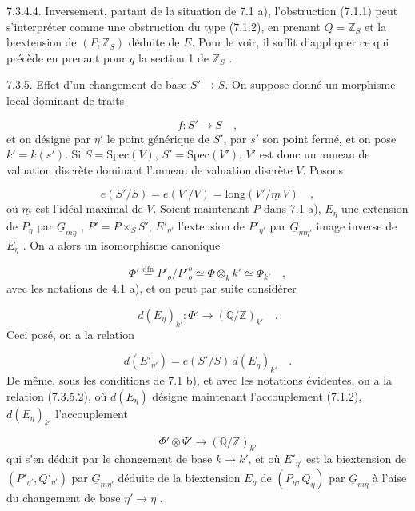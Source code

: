 7.3.4.4. Inversement, partant de la situation de 7.1 a), l'obstruction (7.1.1) peut s'interpréter comme une obstruction du type (7.1.2), en prenant $Q = \mathbb{Z}_S$ et la biextension de $(P,\mathbb{Z}_S)$ déduite de $E$. Pour le voir, il suffit d'appliquer ce qui précède en prenant pour $q$ la section 1 de $\mathbb{Z}_S$ .

7.3.5. \underline{Effet d'un changement de base} $S' \longrightarrow S$. On suppose donné un morphisme local dominant de traits

\begin{equation*}
f : S' \longrightarrow S \quad ,
\end{equation*}
et on désigne par $\eta'$ le point générique de $S'$, par $s'$ son point fermé, et on pose $k'=k(s')$. Si $S=\mathrm{Spec}(V)$, $S' = \mathrm{Spec}(V')$, $V'$ est donc un anneau de valuation discrète dominant l'anneau de valuation discrète $V$. Posons

\begin{equation}\tag{7.3.5.1}
e(S'/S) = e(V'/V) = \mathrm{long}(V'/\underline{m}\,V) \quad ,
\end{equation}
où $\underline{m}$ est l'idéal maximal de $V$. Soient maintenant $P$ dans 7.1 a), $E_\eta$ une extension de $P_\eta$ par $\underline{G}_{m\eta}$ , $P' = P\times_S S'$, $E'_{\eta'}$ l'extension de $P'_{\eta'}$ par $\underline{G}_{m\eta'}$ image inverse de $E_\eta$ . On a alors un isomorphisme canonique 



\begin{equation*}
 \Phi' \overset{\mathrm{dfn}}{=} P'_o/{P'}^{o}_{o} \simeq \Phi \otimes_k k' \simeq \Phi_{k'} \quad ,
\end{equation*}
avec les notations de 4.1 a), et on peut par suite considérer

\begin{equation*}
d(E_\eta)_{k'} : \Phi' \longrightarrow (\mathbb{Q}/\mathbb{Z})_{k'} \quad .
\end{equation*}
Ceci posé, on a la relation

\begin{equation}\tag{7.3.5.2}
d(E'_{\eta'}) = e(S'/S)\, d(E_\eta)_{k'} \quad .
\end{equation}
De même, sous les conditions de 7.1 b), et avec les notations évidentes, on a la relation (7.3.5.2), où $d(E_\eta)$ désigne maintenant l'accouplement (7.1.2), $d(E_\eta)_{k'}$ l'accouplement

\begin{equation*}
\Phi' \otimes \Psi' \longrightarrow (\mathbb{Q}/\mathbb{Z})_{k'}
\end{equation*}
qui s'en déduit par le changement de base $k \longrightarrow k'$, et où $E'_{\eta'}$ est la biextension de $(P'_{\eta'}, Q'_{\eta'})$ par $\underline{G}_{m\eta'}$ déduite de la biextension $E_\eta$ de $(P_\eta,Q_\eta)$ par $\underline{G}_{m\eta}$ à l'aise du changement de base $\eta' \longrightarrow \eta$ .

